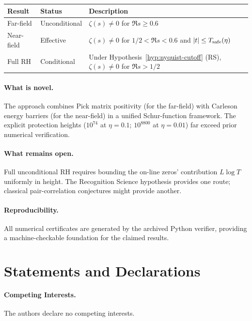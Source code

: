 \documentclass[11pt]{article}
\theoremstyle{definition}
\theoremstyle{remark}
\theoremstyle{definition}
\begin{document}
\begin{center}
\renewcommand{\arraystretch}{1.3}
\begin{tabular}{p{3cm}p{2.5cm}p{8cm}}
\toprule
\textbf{Result} & \textbf{Status} & \textbf{Description} \\
\midrule
Far-field & Unconditional & $\zeta(s) \neq 0$ for $\Re s \ge 0.6$ \\
Near-field & Effective & $\zeta(s) \neq 0$ for $1/2 < \Re s < 0.6$ and $|t| \le T_{\rm safe}(\eta)$ \\
Full RH & Conditional & Under Hypothesis~\ref{hyp:nyquist-cutoff} (RS), $\zeta(s) \neq 0$ for $\Re s > 1/2$ \\
\bottomrule
\end{tabular}
\end{center}

\paragraph{What is novel.} The approach combines Pick matrix positivity (for the far-field) with Carleson energy barriers (for the near-field) in a unified Schur-function framework. The explicit protection heights ($10^{74}$ at $\eta = 0.1$; $10^{8800}$ at $\eta = 0.01$) far exceed prior numerical verification.

\paragraph{What remains open.} Full unconditional RH requires bounding the on-line zeros' contribution $L\log T$ uniformly in height. The Recognition Science hypothesis provides one route; classical pair-correlation conjectures might provide another.

\paragraph{Reproducibility.} All numerical certificates are generated by the archived Python verifier, providing a machine-checkable foundation for the claimed results.

\section*{Statements and Declarations}

\paragraph{Competing Interests.} The authors declare no competing interests.
\end{document}
